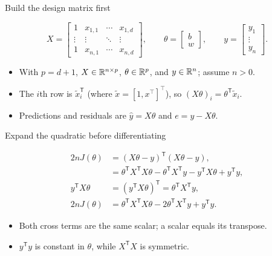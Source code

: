 \begin{frame}{Build the design matrix first}
\begin{definitionbox}
\[
X=\begin{bmatrix}
1&x_{1,1}&\cdots&x_{1,d}\\
\vdots&\vdots&\ddots&\vdots\\
1&x_{n,1}&\cdots&x_{n,d}
\end{bmatrix},\qquad
\theta=\begin{bmatrix}b\\w\end{bmatrix},\qquad
y=\begin{bmatrix}y_1\\\vdots\\y_n\end{bmatrix}.
\]
\end{definitionbox}
\small
\begin{itemize}\setlength{\itemsep}{9pt}
\item With $p=d+1$, $X\in\mathbb{R}^{n\times p}$, $\theta\in\mathbb{R}^p$, and $y\in\mathbb{R}^n$; assume $n>0$.
\item The $i$th row is $\widetilde x_i^{\mathsf T}$ (where $\widetilde x =[1, x^{\top}]^{\top}$), so $(X\theta)_i=\theta^{\mathsf T}\widetilde x_i$.
\item Predictions and residuals are $\widehat y=X\theta$ and $e=y-X\theta$.
\end{itemize}
\end{frame}

\begin{frame}{Expand the quadratic before differentiating}
\begin{definitionbox}
\[
\begin{aligned}
2nJ(\theta)&=(X\theta-y)^{\mathsf T}(X\theta-y),\\
&=\theta^{\mathsf T}X^{\mathsf T}X\theta
-\theta^{\mathsf T}X^{\mathsf T}y-y^{\mathsf T}X\theta+y^{\mathsf T}y,\\
y^{\mathsf T}X\theta&=(y^{\mathsf T}X\theta)^{\mathsf T}
=\theta^{\mathsf T}X^{\mathsf T}y,\\
2nJ(\theta)&=\theta^{\mathsf T}X^{\mathsf T}X\theta
-2\theta^{\mathsf T}X^{\mathsf T}y+y^{\mathsf T}y.
\end{aligned}
\]
\end{definitionbox}
\small
\begin{itemize}\setlength{\itemsep}{7pt}
\item Both cross terms are the same scalar; a scalar equals its transpose.
\item $y^{\mathsf T}y$ is constant in $\theta$, while $X^{\mathsf T}X$ is symmetric.
\end{itemize}
\end{frame}

